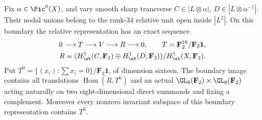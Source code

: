 \begin{lemma}
\label{lem:mixed-degree-two-boundary-group-candidate}
Fix $\alpha\in\Pic^0(X)$, and vary smooth sharp transverse
$C\in|L\otimes\alpha|$, $D\in|L\otimes\alpha^{-1}|$.
Their nodal unions belong to the rank-$34$ relative unit open
inside $|L^2|$. On this boundary the relative representation
has an exact sequence
\[
 \begin{gathered}
 0\longrightarrow T\longrightarrow V\longrightarrow R\longrightarrow0,
 \qquad T=\mathbf F_2^{18}/\mathbf F_2\mathbf1,\\
 R=(H^1_{\et}(C,\mathbf F_2)\oplus
             H^1_{\et}(D,\mathbf F_2))/H^1_{\et}(X,\mathbf F_2).
 \end{gathered}
\]
Put $T^0=\{(x_i):\sum x_i=0\}/\mathbf F_2\mathbf1$,
of dimension sixteen. The boundary image contains all
translations $\operatorname{Hom}(R,T^0)$ and an actual
$\GL_8(\mathbf F_2)\times\GL_8(\mathbf F_2)$ acting naturally
on two eight-dimensional direct summands and fixing a
complement. Moreover every nonzero invariant subspace of
this boundary representation contains $T^0$.
\end{lemma}
